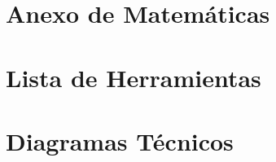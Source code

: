 \documentclass[12pt, twoside]{book}
\begin{document}
	\backmatter
	\printbibliography[title={Referencias Bibliográficas}]
	
	\begin{appendix}
		\chapter{Anexo de Matemáticas}
		
		
		\chapter{Lista de Herramientas}
		
		
		\chapter{Diagramas Técnicos}
		
		
		
	\end{appendix}
	
\end{document}
